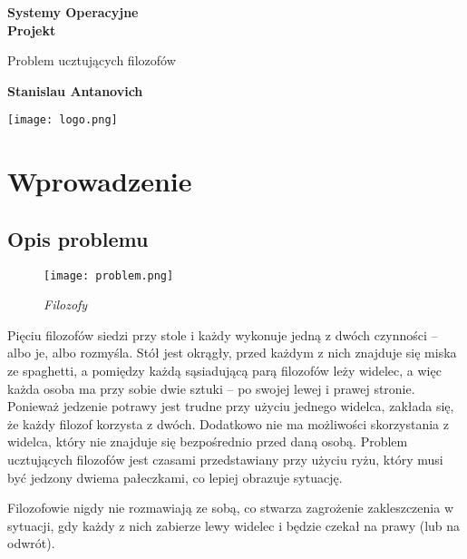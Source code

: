 \documentclass[a4paper, 12pt]{report}
\begin{document}
\begin{titlepage}
\begin{center}

\vspace*{1cm}

\textbf{Systemy Operacyjne\\ Projekt}

\vspace{0.5cm}
Problem ucztujących filozofów

\vspace{1.5cm}

\textbf{Stanislau Antanovich}

\vfill

\vspace{0.8cm}

\texttt{[image: logo.png]}

\end{center}
\end{titlepage}

\tableofcontents

\listoffigures
\newpage

\chapter{Wprowadzenie}
\section{Opis problemu}

\begin{wrapfigure}{r}{0.5\textwidth}
		\centering
		\texttt{[image: problem.png]}
		\caption{\textit{Filozofy}}
\end{wrapfigure}

Pięciu filozofów siedzi przy stole i każdy wykonuje jedną z dwóch czynności – albo je, albo rozmyśla. Stół jest okrągły, przed każdym z nich znajduje się miska ze spaghetti, a pomiędzy każdą sąsiadującą parą filozofów leży widelec, a więc każda osoba ma przy sobie dwie sztuki – po swojej lewej i prawej stronie. Ponieważ jedzenie potrawy jest trudne przy użyciu jednego widelca, zakłada się, że każdy filozof korzysta z dwóch. Dodatkowo nie ma możliwości skorzystania z widelca, który nie znajduje się bezpośrednio przed daną osobą. Problem ucztujących filozofów jest czasami przedstawiany przy użyciu ryżu, który musi być jedzony dwiema pałeczkami, co lepiej obrazuje sytuację.

Filozofowie nigdy nie rozmawiają ze sobą, co stwarza zagrożenie zakleszczenia w sytuacji, gdy każdy z nich zabierze lewy widelec i będzie czekał na prawy (lub na odwrót).
\end{document}
